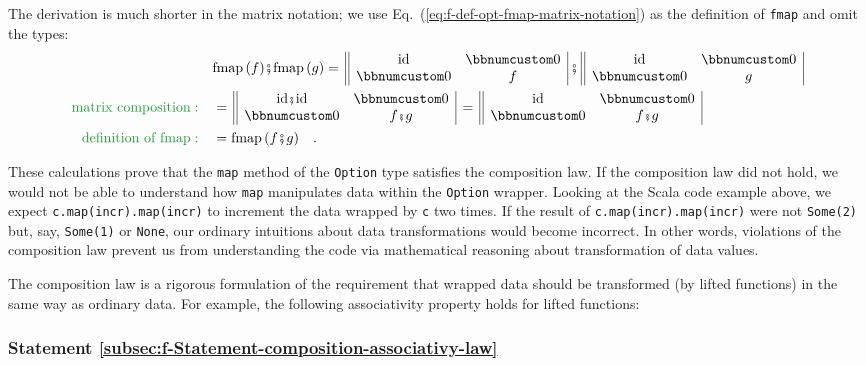 The derivation is much shorter in the matrix notation; we use Eq.~(\ref{eq:f-def-opt-fmap-matrix-notation})
as the definition of \lstinline!fmap! and omit the types:\vspace{-0.45\baselineskip}
\begin{align*}
 & \text{fmap}\,(f)\bef\text{fmap}\,(g)=\,\begin{array}{||cc|}
\text{id} & \bbnum 0\\
\bbnum 0 & f
\end{array}\,\bef\,\begin{array}{||cc|}
\text{id} & \bbnum 0\\
\bbnum 0 & g
\end{array}\\
{\color{greenunder}\text{matrix composition}:}\quad & =\,\begin{array}{||cc|}
\text{id}\bef\text{id} & \bbnum 0\\
\bbnum 0 & f\bef g
\end{array}\,=\,\begin{array}{||cc|}
\text{id} & \bbnum 0\\
\bbnum 0 & f\bef g
\end{array}\\
{\color{greenunder}\text{definition of fmap}:}\quad & =\text{fmap}\,(f\bef g)\quad.
\end{align*}
\vspace{-1.4\baselineskip}

These calculations prove that the \lstinline!map! method of the \lstinline!Option!
type satisfies the composition law. If the composition law did not
hold, we would not be able to understand how \lstinline!map! manipulates
data within the \lstinline!Option! wrapper. Looking at the Scala
code example above, we expect \lstinline!c.map(incr).map(incr)! to
increment the data wrapped by \lstinline!c! two times. If the result
of \lstinline!c.map(incr).map(incr)! were not \lstinline!Some(2)!
but, say, \lstinline!Some(1)! or \lstinline!None!, our ordinary
intuitions about data transformations would become incorrect. In other
words, violations of the composition law prevent us from understanding
the code via mathematical reasoning about transformation of data values.

The composition law is a rigorous formulation of the requirement that
wrapped data should be transformed (by lifted functions) in the same
way as ordinary data. For example, the following associativity property
holds for lifted functions:

\subsubsection{Statement \label{subsec:f-Statement-composition-associativy-law}\ref{subsec:f-Statement-composition-associativy-law}}

